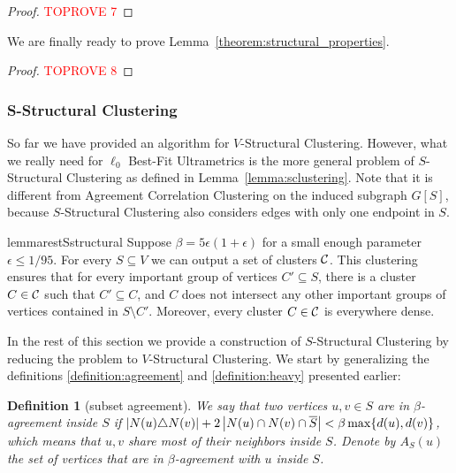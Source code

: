 \documentclass{article}
\newtheorem{definition}{Definition}[section]
\begin{document}
\begin{proof}\textcolor{red}{TOPROVE 7}\end{proof}

We are finally ready to prove Lemma~\ref{theorem:structural_properties}.

\begin{proof}\textcolor{red}{TOPROVE 8}\end{proof}


\subsubsection{S-Structural Clustering}
\label{sec:Sstructure}

So far we have provided an algorithm for $V$-Structural Clustering. However, what we really need for $\ell_0$ Best-Fit Ultrametrics is the more general problem of $S$-Structural Clustering as defined in Lemma~\ref{lemma:sclustering}. Note that it is different from Agreement Correlation Clustering on the induced subgraph $G[S]$, because $S$-Structural Clustering also considers edges with only one endpoint in $S$.

\begin{restatable}{lemma}{restSstructural}
\label{lemma:sclustering}
    Suppose $\beta = 5\epsilon(1+\epsilon)$ for a small enough parameter $\epsilon \leq 1/95$.
    For every $S \subseteq V$
    we can output a set of clusters $\mathcal{C}$. This clustering ensures that for every important group of vertices $C' \subseteq S$, there is a cluster $C \in \mathcal{C}$ such that $C' \subseteq C$, and $C$ does not intersect any other important groups of vertices contained in $S \setminus C'$. Moreover, every
    cluster $C \in \mathcal{C}$ is everywhere dense.
\end{restatable}

In the rest of this section we provide a construction of $S$-Structural Clustering by reducing the problem to $V$-Structural Clustering. We start by generalizing the definitions \ref{definition:agreement} and \ref{definition:heavy} presented earlier:

\begin{definition}[subset agreement]
\label{definition:subset_agreement}
We say that two vertices $u, v\in S$ are in $\beta$-agreement inside $S$ if $\left|N(u)\triangle N(v)\right| + 2\left|N(u)\cap N(v)\cap \overline{S}\right| < \beta \max\{d(u), d(v)\}$, which means that $u, v$ share most of their neighbors inside $S$. Denote by $A_S(u)$ the set of vertices that are in $\beta$-agreement with $u$ inside $S$.
\end{definition}
\end{document}
